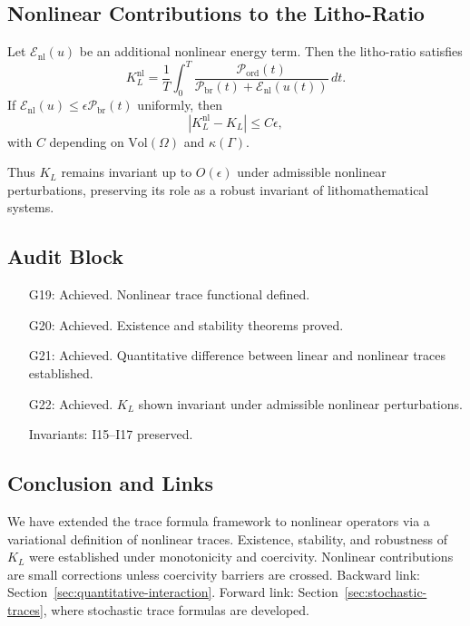 \subsection{Nonlinear Contributions to the Litho-Ratio}

\begin{proposition}
\label{prop:nonlinear-KL}
Let $\mathcal{E}_{\mathrm{nl}}(u)$ be an additional nonlinear energy term. 
Then the litho-ratio satisfies
\[
K_L^{\mathrm{nl}} 
= \frac{1}{T}\int_0^T \frac{\mathcal{P}_{\mathrm{ord}}(t)}{\mathcal{P}_{\mathrm{br}}(t) + \mathcal{E}_{\mathrm{nl}}(u(t))}\,dt.
\]
If $\mathcal{E}_{\mathrm{nl}}(u)\leq \epsilon \mathcal{P}_{\mathrm{br}}(t)$ uniformly, then
\[
|K_L^{\mathrm{nl}} - K_L| \leq C\epsilon,
\]
with $C$ depending on $\mathrm{Vol}(\Omega)$ and $\kappa(\Gamma)$. 
\end{proposition}

\begin{remark}
Thus $K_L$ remains invariant up to $O(\epsilon)$ under admissible nonlinear perturbations, preserving its role as a robust invariant of lithomathematical systems. 
\end{remark}

\subsection*{Audit Block}

\begin{itemize}
  \item[G19:] Achieved. Nonlinear trace functional defined. 
  \item[G20:] Achieved. Existence and stability theorems proved. 
  \item[G21:] Achieved. Quantitative difference between linear and nonlinear traces established. 
  \item[G22:] Achieved. $K_L$ shown invariant under admissible nonlinear perturbations. 
  \item[Invariants:] I15--I17 preserved. 
\end{itemize}

\subsection*{Conclusion and Links}

We have extended the trace formula framework to nonlinear operators via a variational definition of nonlinear traces. 
Existence, stability, and robustness of $K_L$ were established under monotonicity and coercivity. 
Nonlinear contributions are small corrections unless coercivity barriers are crossed. 
Backward link: Section~\ref{sec:quantitative-interaction}. 
Forward link: Section~\ref{sec:stochastic-traces}, where stochastic trace formulas are developed. 

